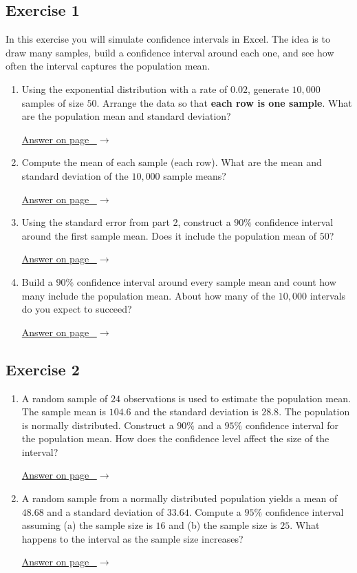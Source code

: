\documentclass[
  11pt,
  letterpaper,
  DIV=11,
  numbers=noendperiod,
  oneside,
  open=any]{scrreprt}
\newcommand{\bsanswerref}[1]{%
  \par\nopagebreak\hypertarget{q-#1}{}\label{q-#1}%
  {\raggedleft\sffamily\footnotesize\hyperlink{a-#1}{\textcolor{bsaccent}{Answer on page \pageref{a-#1}\ $\rightarrow$}}\par}%
  \medskip}
\begin{document}
\subsection*{Exercise 1}\label{exercise-1-11}

In this exercise you will simulate confidence intervals in Excel. The
idea is to draw many samples, build a confidence interval around each
one, and see how often the interval captures the population mean.

\begin{enumerate}
\def\labelenumi{\arabic{enumi}.}
\item
  Using the exponential distribution with a rate of \(0.02\), generate
  \(10{,}000\) samples of size \(50\). Arrange the data so that
  \textbf{each row is one sample}. What are the population mean and
  standard deviation?

  \bsanswerref{bsans113}
\item
  Compute the mean of each sample (each row). What are the mean and
  standard deviation of the \(10{,}000\) sample means?

  \bsanswerref{bsans114}
\item
  Using the standard error from part 2, construct a \(90\%\) confidence
  interval around the first sample mean. Does it include the population
  mean of \(50\)?

  \bsanswerref{bsans115}
\item
  Build a \(90\%\) confidence interval around every sample mean and
  count how many include the population mean. About how many of the
  \(10{,}000\) intervals do you expect to succeed?

  \bsanswerref{bsans116}
\end{enumerate}

\subsection*{Exercise 2}\label{exercise-2-11}

\begin{enumerate}
\def\labelenumi{\arabic{enumi}.}
\item
  A random sample of \(24\) observations is used to estimate the
  population mean. The sample mean is \(104.6\) and the standard
  deviation is \(28.8\). The population is normally distributed.
  Construct a \(90\%\) and a \(95\%\) confidence interval for the
  population mean. How does the confidence level affect the size of the
  interval?

  \bsanswerref{bsans117}
\item
  A random sample from a normally distributed population yields a mean
  of \(48.68\) and a standard deviation of \(33.64\). Compute a \(95\%\)
  confidence interval assuming (a) the sample size is \(16\) and (b) the
  sample size is \(25\). What happens to the interval as the sample size
  increases?

  \bsanswerref{bsans118}
\end{enumerate}
\end{document}
